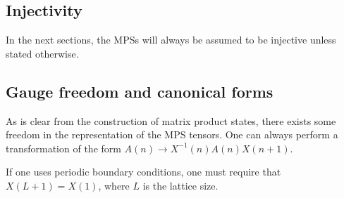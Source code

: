 \subsection{Injectivity}


    In the next sections, the MPSs will always be assumed to be injective unless stated otherwise.

\subsection{Gauge freedom and canonical forms}

    \begin{property}
        As is clear from the construction of matrix product states, there exists some freedom in the representation of the MPS tensors. One can always perform a transformation of the form $A(n)\rightarrow X^{-1}(n)A(n)X(n+1)$.
    \end{property}
    \begin{remark}
        If one uses periodic boundary conditions, one must require that $X(L+1)=X(1)$, where $L$ is the lattice size.
    \end{remark}

